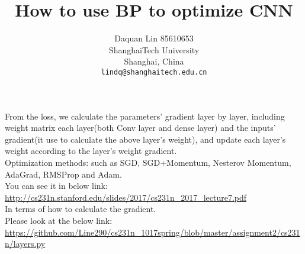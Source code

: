 \documentclass[10pt,letterpaper]{article}
\begin{document}
\title{How to use BP to optimize CNN}

\author{Daquan Lin 85610653\\
ShanghaiTech University\\
Shanghai, China\\
{\tt\small lindq@shanghaitech.edu.cn}
}

\maketitle
From the loss, we calculate the parameters' gradient layer by layer, including weight matrix each layer(both Conv layer and dense layer) and the inputs' gradient(it use to calculate the above layer's weight),  and update each layer's weight according to the layer's weight gradient.\\
Optimization methods: such as SGD, SGD+Momentum, Nesterov Momentum, AdaGrad, RMSProp and Adam.\\
You can see it in below link:\\
\url{http://cs231n.stanford.edu/slides/2017/cs231n_2017_lecture7.pdf}\\
In terms of how to calculate the gradient.\\
Please look at the below link:\\
\url{https://github.com/Line290/cs231n_1017spring/blob/master/assignment2/cs231n/layers.py}
\end{document}
